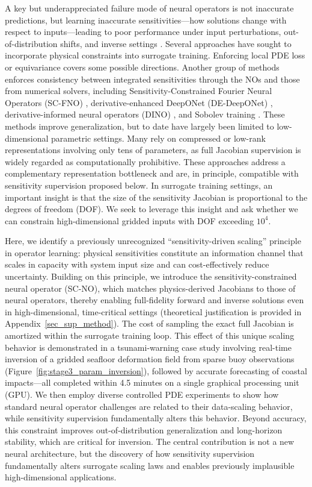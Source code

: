 A key but underappreciated failure mode of neural operators is not inaccurate predictions, but learning inaccurate sensitivities—how solutions change with respect to inputs—leading to poor performance under input perturbations, out-of-distribution shifts, and inverse settings \citep{choi2024applications, behroozi2025sensitivity}. Several approaches have sought to incorporate physical constraints into surrogate training. Enforcing local PDE loss \citep{li2024physics} or equivariance \citep{han2022equivariant} covers some possible directions. Another group of methods enforces consistency between integrated sensitivities through the NOs and those from numerical solvers, including Sensitivity-Constrained Fourier Neural Operators (SC-FNO) \citep{behroozi2025sensitivity}, derivative-enhanced DeepONet (DE-DeepONet) \citep{qiu2024derivative}, derivative-informed neural operators (DINO) \citep{cao2025derivative}, and Sobolev training \citep{czarnecki2017sobolev}. These methods improve generalization, but to date have largely been limited to low-dimensional parametric settings. Many rely on compressed or low-rank representations involving only tens of parameters, as full Jacobian supervision is widely regarded as computationally prohibitive. These approaches address a complementary representation bottleneck and are, in principle, compatible with sensitivity supervision proposed below. In surrogate training settings, an important insight is that the size of the sensitivity Jacobian is proportional to the degrees of freedom (DOF). We seek to leverage this insight and ask whether we can constrain high-dimensional gridded inputs with DOF exceeding $10^4$.

Here, we identify a previously unrecognized ``sensitivity-driven scaling'' principle in operator learning: physical sensitivities constitute an information channel that scales in capacity with system input size and can cost-effectively reduce uncertainty. Building on this principle, we introduce the sensitivity-constrained neural operator (SC-NO), which matches physics-derived Jacobians to those of neural operators, thereby enabling full-fidelity forward and inverse solutions even in high-dimensional, time-critical settings (theoretical justification is provided in Appendix~\ref{sec_sup_method}). The cost of sampling the exact full Jacobian is amortized within the surrogate training loop. This effect of this unique scaling behavior is demonstrated in a tsunami-warning case study involving real-time inversion of a gridded seafloor deformation field from sparse buoy observations (Figure~\ref{fig:stage3_param_inversion}), followed by accurate forecasting of coastal impacts—all completed within 4.5 minutes on a single graphical processing unit (GPU). We then employ diverse controlled PDE experiments to show how standard neural operator challenges are related to their data-scaling behavior, while sensitivity supervision fundamentally alters this behavior. Beyond accuracy, this constraint improves out-of-distribution generalization and long-horizon stability, which are critical for inversion. The central contribution is not a new neural architecture, but the discovery of how sensitivity supervision fundamentally alters surrogate scaling laws and enables previously implausible high-dimensional applications.
